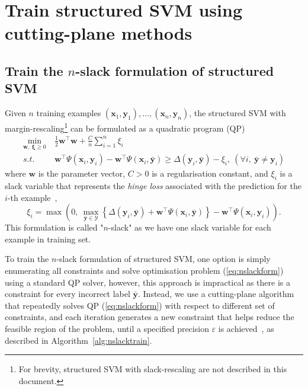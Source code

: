 \documentclass[9pt]{extarticle}
\newcommand{\eat}[1]{}
\begin{document}
\section{Train structured SVM using cutting-plane methods}
\label{sec:ssvm}


\subsection{Train the $n$-slack formulation of structured SVM}
\label{sec:nslackssvm}


Given $n$ training examples $(\mathbf{x}_1, \mathbf{y}_1), \dots, (\mathbf{x}_n, \mathbf{y}_n)$, 
the structured SVM with margin-rescaling\footnote{For brevity, structured SVM with slack-rescaling are not described in this document.}
can be formulated as a quadratic program (QP)
\begin{equation}
\label{eq:nslackform}
\begin{aligned}
\min_{\mathbf{w}, ~\bm{\xi} \ge 0} ~& \frac{1}{2} \mathbf{w}^\top \mathbf{w} + \frac{C}{n} \sum_{i=1}^n \xi_i \\
s.t.~~ ~& \mathbf{w}^\top \Psi(\mathbf{x}_i, \mathbf{y}_i) - \mathbf{w}^\top \Psi(\mathbf{x}_i, \bar{\mathbf{y}}) \ge 
       \Delta(\mathbf{y}_i, \bar{\mathbf{y}}) - \xi_i, ~(\forall i,~ \bar{\mathbf{y}} \neq \mathbf{y}_i)
\end{aligned}
\end{equation}
where $\mathbf{w}$ is the parameter vector, $C > 0$ is a regularisation constant, and $\xi_i$
is a slack variable that represents the \emph{hinge loss} associated with the prediction for the $i$-th example~\cite{tsochantaridis2005large},
\begin{equation*}
\xi_i = \max \left( 0,~ 
        \max_{\bar{\mathbf{y}} \in \mathcal{Y}} 
        \left\{ \Delta(\mathbf{y}_i, \bar{\mathbf{y}}) + \mathbf{w}^\top \Psi(\mathbf{x}_i, \bar{\mathbf{y}}) \right\} -
        \mathbf{w}^\top \Psi(\mathbf{x}_i, \mathbf{y}_i) \right).
\end{equation*}
This formulation is called "$n$-slack" as we have one slack variable for each example in training set. \eat{citation}

To train the $n$-slack formulation of structured SVM, one option is simply enumerating all constraints and 
solve optimisation problem (\ref{eq:nslackform}) using a standard QP solver, 
however, this approach is impractical as there is a constraint for every incorrect label $\bar{\mathbf{y}}$.
Instead, we use a cutting-plane algorithm that repeatedly solves QP (\ref{eq:nslackform}) with respect to different set of constraints, 
and each iteration generates a new constraint that helps reduce the feasible region of the problem, 
until a specified precision $\varepsilon$ is achieved~\cite{joachims2009predicting}, as described in Algorithm~\ref{alg:nslacktrain}.
\end{document}
